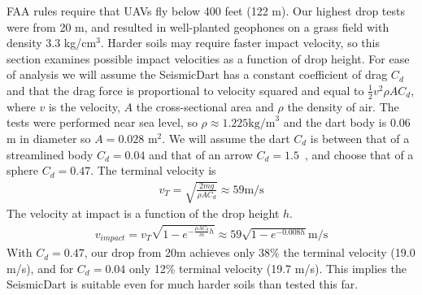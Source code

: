 FAA rules require that UAVs fly below 400 feet (122 m). Our highest drop tests were from 20 m, and resulted in well-planted geophones on a grass field with density 3.3 kg/cm$^3$. Harder soils may require faster impact velocity, so this section examines possible impact velocities as a function of drop height.
For ease of analysis we will assume the SeismicDart has a constant coefficient of drag $C_d$ and that the drag force is proportional to velocity squared and equal to $\frac{1}{2} v^2 \rho A C_d$, where $v$ is the velocity, $A$ the cross-sectional area and $\rho$ the density of air.  The tests were performed near sea level, so $\rho \approx 1.225  \text{kg/m}^3$ and the dart body is 0.06 m in diameter so $A=0.028$ m$^2$.  We will assume the dart $C_d$ is between that of a streamlined body $C_d=0.04$ and that of an arrow $C_d=1.5$~\cite{miyazaki2013aerodynamic}, and choose that of a sphere $C_d=0.47$.
The terminal velocity is 
\begin{align}
v_T = \sqrt{\frac{2 m g}{\rho A  C_d}} \approx 59 \text{m/s}
\end{align}
The velocity at impact is a function of the drop height $h$.
\begin{align}
v_{impact} = v_T  \sqrt{ 1 - e^{ -\frac{\rho A  C_d}{m} h }} \approx 59\sqrt{ 1 - e^{ -0.008 h }} \text{m/s}
\end{align}
With  $C_d=0.47$, our drop from 20m achieves only 38\% the terminal velocity (19.0 m/s), and for $C_d=0.04$ only 12\% terminal velocity  (19.7 m/s).
This implies the SeismicDart is suitable even for much harder soils than tested this far.

